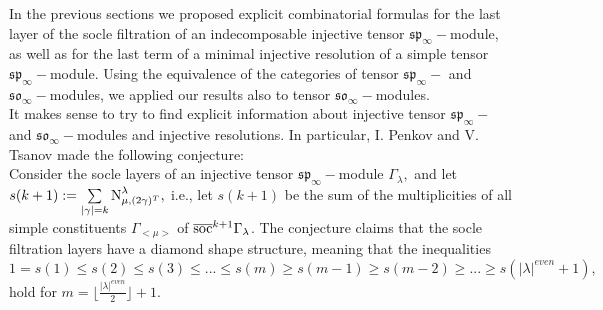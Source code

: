 \documentclass[main.tex]{subfiles}
\begin{document}
In the previous sections we proposed explicit combinatorial formulas for the last layer of the socle filtration of an indecomposable injective tensor $\mathfrak{sp}_\infty-$module, as well as for the last term of a minimal injective resolution of a simple tensor $\mathfrak{sp}_\infty-$module. Using the equivalence of the categories of tensor $\mathfrak{sp}_\infty-$ and $\mathfrak{so}_\infty-$modules, we applied our results also to tensor $\mathfrak{so}_\infty-$modules. \\

It makes sense to try to find explicit information about injective tensor $\mathfrak{sp}_\infty-$ and $\mathfrak{so}_\infty-$modules and injective resolutions. In particular, I. Penkov and V. Tsanov made the following conjecture: \\

Consider the socle layers of an injective tensor $\mathfrak{sp}_\infty-$module $\Gamma_\lambda,$ and let $s(k+1):= \sum\limits_{|\gamma|=k}\text{N}^{\lambda}_{\mu, (2\gamma)^T},$ i.e., let $s(k+1)$ be the sum of the multiplicities of all simple constituents $\Gamma_{<\mu>}$ of $\overline{\text{soc}}^{k+1}\Gamma_\lambda$. The conjecture claims that the socle filtration layers have a diamond shape structure, meaning that the inequalities
$$
    1=s(1)\leq s(2) \leq s(3) \leq ... \leq s(m) \geq s(m-1) \geq s(m-2) \geq ... \geq s(|\lambda|^{even}+1),
$$
hold for  $m = \lfloor{\frac{|\lambda|^{even}}{2}}\rfloor+1.$
\end{document}
